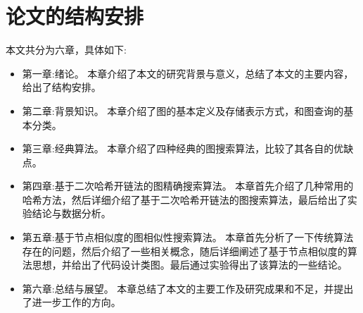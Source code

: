 \documentclass{XDBAthesis}
\begin{document}
\section{论文的结构安排}
本文共分为六章，具体如下:
\begin{itemize}
    \item 第一章:绪论。 本章介绍了本文的研究背景与意义，总结了本文的主要内容，给出了结构安排。
    \item 第二章:背景知识。 本章介绍了图的基本定义及存储表示方式，和图查询的基本分类。
    \item 第三章:经典算法。 本章介绍了四种经典的图搜索算法，比较了其各自的优缺点。
    \item 第四章:基于二次哈希开链法的图精确搜索算法。 本章首先介绍了几种常用的哈希方法，然后详细介绍了基于二次哈希开链法的图搜索算法，最后给出了实验结论与数据分析。
    \item 第五章:基于节点相似度的图相似性搜索算法。 本章首先分析了一下传统算法存在的问题，然后介绍了一些相关概念，随后详细阐述了基于节点相似度的算法思想，并给出了代码设计类图。最后通过实验得出了该算法的一些结论。
    \item 第六章:总结与展望。 本章总结了本文的主要工作及研究成果和不足，并提出了进一步工作的方向。
\end{itemize}



\ifx\allfiles\undefined
\renewcommand\refname{参考文献}
%

\end{document}
